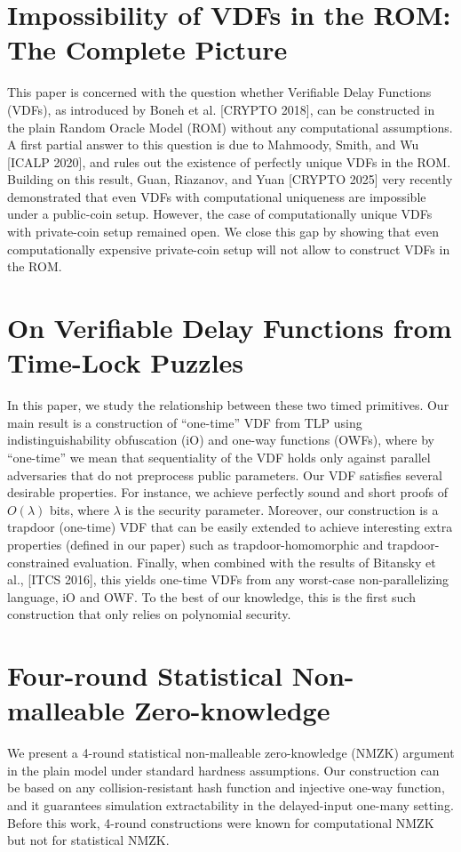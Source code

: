 \documentclass[11pt,oneside]{book}
\theoremstyle{definition}
\theoremstyle{remark}
\theoremstyle{plain}
\begin{document}
\section{\cite{cryptoeprint:2025/1773} Impossibility of VDFs in the ROM: The Complete Picture}
This paper is concerned with the question whether Verifiable Delay Functions (VDFs), as introduced by Boneh et al. [CRYPTO 2018], can be constructed in the plain Random Oracle Model (ROM) without any computational assumptions. A first partial answer to this question is due to Mahmoody, Smith, and Wu [ICALP 2020], and rules out the existence of perfectly unique VDFs in the ROM. Building on this result, Guan, Riazanov, and Yuan [CRYPTO 2025] very recently demonstrated that even VDFs with computational uniqueness are impossible under a public-coin setup. However, the case of computationally unique VDFs with private-coin setup remained open. We close this gap by showing that even computationally expensive private-coin setup will not allow to construct VDFs in the ROM.

\section{\cite{cryptoeprint:2025/1782} On Verifiable Delay Functions from Time-Lock Puzzles}
 In this paper, we study the relationship between these two timed primitives. Our main result is a construction of ``one-time'' VDF from TLP using indistinguishability obfuscation (iO) and one-way functions (OWFs), where by ``one-time'' we mean that sequentiality of the VDF holds only against parallel adversaries that do not preprocess public parameters. Our VDF satisfies several desirable properties. For instance, we achieve perfectly sound and short proofs of $O(\lambda)$ bits, where $\lambda$ is the security parameter. Moreover, our construction is a trapdoor (one-time) VDF that can be easily extended to achieve interesting extra properties (defined in our paper) such as trapdoor-homomorphic and trapdoor-constrained evaluation. Finally, when combined with the results of Bitansky et al., [ITCS 2016], this yields one-time VDFs from any worst-case non-parallelizing language, iO and OWF. To the best of our knowledge, this is the first such construction that only relies on polynomial security.
 
 \section{\cite{cryptoeprint:2025/1787} Four-round Statistical Non-malleable Zero-knowledge}
 We present a 4-round statistical non-malleable zero-knowledge (NMZK) argument in the plain model under standard hardness assumptions. Our construction can be based on any collision-resistant hash function and injective one-way function, and it guarantees simulation extractability in the delayed-input one-many setting. Before this work, 4-round constructions were known for computational NMZK but not for statistical NMZK.
 
\end{document}
